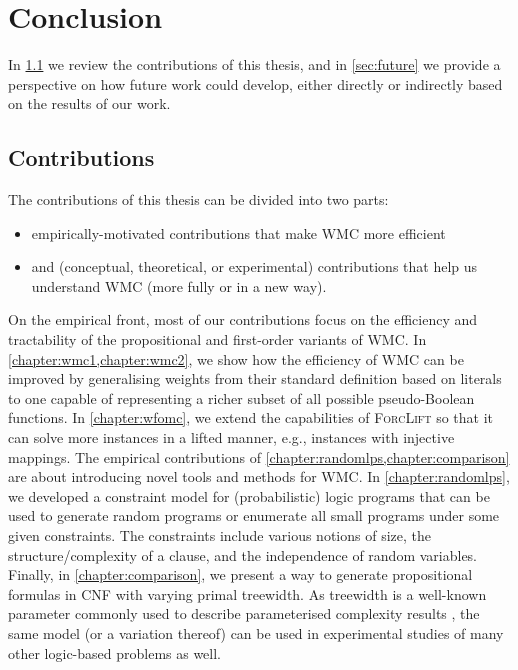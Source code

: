 \chapter{Conclusion}\label{chapter:conclusion}

In \cref{sec:contributions} we review the contributions of this thesis, and in
\cref{sec:future} we provide a perspective on how future work could develop,
either directly or indirectly based on the results of our work.

\section{Contributions}\label{sec:contributions}


The contributions of this thesis can be divided into two parts:
\begin{itemize}
  \item empirically-motivated contributions that make WMC more efficient
  \item and (conceptual, theoretical, or experimental) contributions that help
        us understand WMC (more fully or in a new way).
\end{itemize}


On the empirical front, most of our contributions focus on the efficiency and
tractability of the propositional and first-order variants of WMC\@. In
\cref{chapter:wmc1,chapter:wmc2}, we show how the efficiency of WMC can be
improved by generalising weights from their standard definition based on
literals to one capable of representing a richer subset of all possible
pseudo-Boolean functions. In \cref{chapter:wfomc}, we extend the capabilities of
\textsc{ForcLift} \citep{DBLP:conf/ijcai/BroeckTMDR11} so that it can solve more
instances in a lifted manner, e.g., instances with injective mappings. The
empirical contributions of \cref{chapter:randomlps,chapter:comparison} are about
introducing novel tools and methods for WMC\@. In \cref{chapter:randomlps}, we
developed a constraint model for (probabilistic) logic programs that can be used
to generate random programs or enumerate all small programs under some given
constraints. The constraints include various notions of size, the
structure/complexity of a clause, and the independence of random variables.
Finally, in \cref{chapter:comparison}, we present a way to generate
propositional formulas in CNF with varying primal treewidth. As treewidth is a
well-known parameter commonly used to describe parameterised complexity results
\citep{DBLP:series/txcs/DowneyF13}, the same model (or a variation thereof) can
be used in experimental studies of many other logic-based problems as well.

